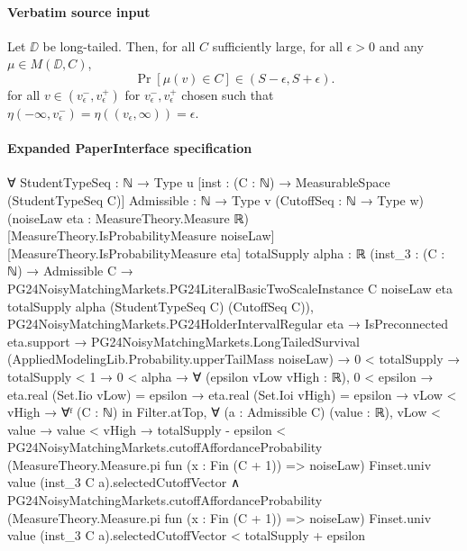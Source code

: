 \documentclass[10pt]{article}
\begin{document}
\paragraph{Verbatim source input}
\begin{ReviewVerbatim}
\begin{proposition}\label{thm2v2}
Let $\DD$ be long-tailed. Then, for all $C$ sufficiently large, for all $\epsilon>0$ and any $\mu\in M(\DD, C)$,
\begin{equation}
    \Pr[\mu(v)\in C]\in (S-\epsilon, S+\epsilon).
\end{equation}
for all $v\in (v_\epsilon^-, v_\epsilon^+)$ for $v_\epsilon^-, v_\epsilon^+$ chosen such that $\eta(-\infty, v_\epsilon^-) = \eta((v_\epsilon, \infty)) = \epsilon$.
\end{proposition}
\end{ReviewVerbatim}



\paragraph{Expanded PaperInterface specification}
\begin{ReviewVerbatim}
∀ {StudentTypeSeq : ℕ → Type u} [inst : (C : ℕ) → MeasurableSpace (StudentTypeSeq C)] {Admissible : ℕ → Type v}
  (CutoffSeq : ℕ → Type w) (noiseLaw eta : MeasureTheory.Measure ℝ) [MeasureTheory.IsProbabilityMeasure noiseLaw]
  [MeasureTheory.IsProbabilityMeasure eta] {totalSupply alpha : ℝ}
  (inst_3 :
    (C : ℕ) →
      Admissible C →
        PG24NoisyMatchingMarkets.PG24LiteralBasicTwoScaleInstance C noiseLaw eta totalSupply alpha (StudentTypeSeq C)
          (CutoffSeq C)),
  PG24NoisyMatchingMarkets.PG24HolderIntervalRegular eta →
    IsPreconnected eta.support →
      PG24NoisyMatchingMarkets.LongTailedSurvival (AppliedModelingLib.Probability.upperTailMass noiseLaw) →
        0 < totalSupply →
          totalSupply < 1 →
            0 < alpha →
              ∀ (epsilon vLow vHigh : ℝ),
                0 < epsilon →
                  eta.real (Set.Iio vLow) = epsilon →
                    eta.real (Set.Ioi vHigh) = epsilon →
                      vLow < vHigh →
                        ∀ᶠ (C : ℕ) in Filter.atTop,
                          ∀ (a : Admissible C) (value : ℝ),
                            vLow < value →
                              value < vHigh →
                                totalSupply - epsilon <
                                    PG24NoisyMatchingMarkets.cutoffAffordanceProbability
                                      (MeasureTheory.Measure.pi fun (x : Fin (C + 1)) => noiseLaw) Finset.univ value
                                      (inst_3 C a).selectedCutoffVector ∧
                                  PG24NoisyMatchingMarkets.cutoffAffordanceProbability
                                      (MeasureTheory.Measure.pi fun (x : Fin (C + 1)) => noiseLaw) Finset.univ value
                                      (inst_3 C a).selectedCutoffVector <
                                    totalSupply + epsilon
\end{ReviewVerbatim}
\end{document}
